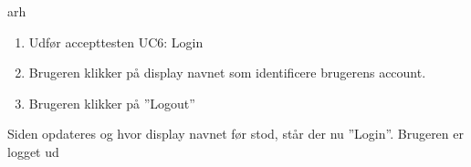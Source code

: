 arh

		{
		\begin{enumerate}
			\item Udfør accepttesten UC6: Login
			\item Brugeren klikker på display navnet som identificere brugerens account.
			\item Brugeren klikker på ''Logout''
		\end{enumerate}
		} %
		{Siden opdateres og hvor display navnet før stod, står der nu ''Login''. Brugeren er logget ud} %
		{} %
		{} %

